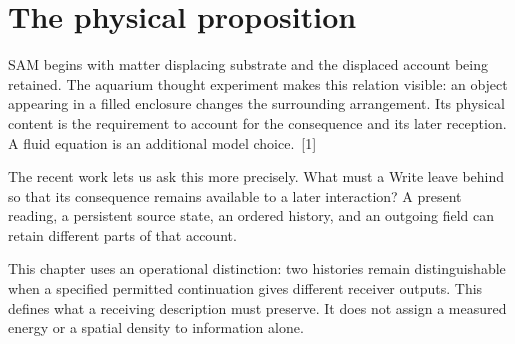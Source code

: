 \documentclass[10pt,twocolumn,letterpaper]{article}
\begin{document}
\raggedbottom
{}
\section{The physical proposition}
SAM begins with matter displacing substrate and the displaced account being retained. The aquarium thought experiment makes this relation visible: an object appearing in a filled enclosure changes the surrounding arrangement. Its physical content is the requirement to account for the consequence and its later reception. A fluid equation is an additional model choice.~[1]

The recent work lets us ask this more precisely. What must a Write leave behind so that its consequence remains available to a later interaction? A present reading, a persistent source state, an ordered history, and an outgoing field can retain different parts of that account.

This chapter uses an operational distinction: two histories remain distinguishable when a specified permitted continuation gives different receiver outputs. This defines what a receiving description must preserve. It does not assign a measured energy or a spatial density to information alone.
\end{document}
